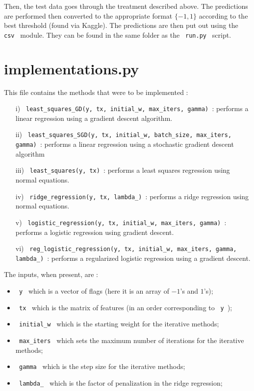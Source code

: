 \documentclass[11pt, oneside]{article}   	%
\begin{document}
Then, the test data goes through the treatment described above. The predictions are performed then converted to the appropriate format $ \{ -1, 1 \}$ according to the best threshold (found via Kaggle). The predictions are then put out using the \lstinline" csv " module. They can be found in the same folder as the \lstinline" run.py " script.

\section{implementations.py} \label{impl}

This file contains the methods that were to be implemented : 
\begin{itemize}
\item[i)] \lstinline" least_squares_GD(y, tx, initial_w, max_iters, gamma) ": performs a linear regression using a gradient descent algorithm. 
\item[ii)] \lstinline" least_squares_SGD(y, tx, initial_w, batch_size, max_iters, gamma) ": performs a linear regression using a stochastic gradient descent algorithm 

\item[iii)] \lstinline" least_squares(y, tx) ": performs a least squares regression using normal equations.
\item[iv)] \lstinline" ridge_regression(y, tx, lambda_) ": performs a ridge regression using normal equations.
\item[v)] \lstinline" logistic_regression(y, tx, initial_w, max_iters, gamma) ": performs a logistic regression using gradient descent.
\item[vi)] \lstinline" reg_logistic_regression(y, tx, initial_w, max_iters, gamma, lambda_) ": performs a regularized logistic regression using a gradient descent.
\end{itemize}
The inputs, when present, are : 
\begin{itemize}
\item \lstinline" y " which is a vector of flags (here it is an array of $-1$'s and $1$'s); 
\item \lstinline" tx " which is the matrix of features (in an order corresponding to \lstinline" y ");
\item \lstinline" initial_w " which is the starting weight for the iterative methods;
\item \lstinline" max_iters " which sets the maximum number of iterations for the iterative methods;
\item \lstinline" gamma " which is the step size for the iterative methods;
\item \lstinline" lambda_ " which is the factor of penalization in the ridge regression;
\end{itemize}
\end{document}
